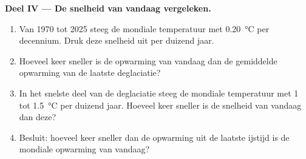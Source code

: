 \begin{problem}
\medskip
\noindent\textbf{Deel IV --- De snelheid van vandaag vergeleken.}
\begin{enumerate}[resume]
  \item Van 1970 tot 2025 steeg de mondiale temperatuur met
        \qty{0.20}{\degreeCelsius} per decennium. Druk deze snelheid uit per
        duizend jaar.
  \item Hoeveel keer sneller is de opwarming van vandaag dan de gemiddelde opwarming van
        de laatste deglaciatie?
  \item In het snelste deel van de deglaciatie steeg de mondiale temperatuur
        met 1 tot \qty{1.5}{\degreeCelsius} per duizend jaar. Hoeveel keer
        sneller is de snelheid van vandaag dan deze?
  \item Besluit: hoeveel keer sneller dan de opwarming uit de laatste ijstijd
        is de mondiale opwarming van vandaag?
\end{enumerate}
\end{problem}
